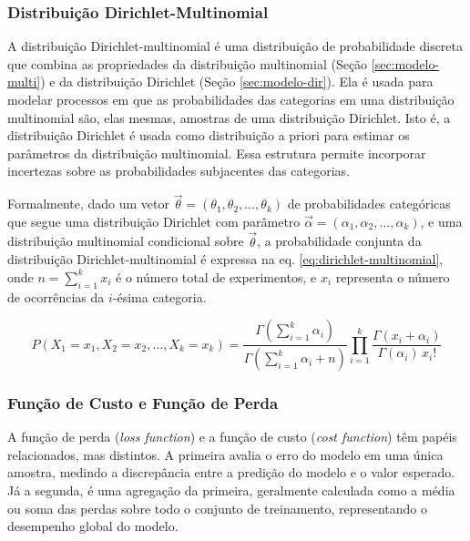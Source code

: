 \subsubsection{Distribuição Dirichlet-Multinomial}
\label{sec:modelo-dir-multi}

A distribuição Dirichlet-multinomial \cite{distbook-dirichlet} é uma distribuição de probabilidade discreta que combina as propriedades da distribuição multinomial (Seção \ref{sec:modelo-multi}) e da distribuição Dirichlet (Seção \ref{sec:modelo-dir}). Ela é usada para modelar processos em que as probabilidades das categorias em uma distribuição multinomial são, elas mesmas, amostras de uma distribuição Dirichlet. Isto é, a distribuição Dirichlet é usada como distribuição a priori para estimar os parâmetros da distribuição multinomial. Essa estrutura permite incorporar incertezas sobre as probabilidades subjacentes das categorias.

Formalmente, dado um vetor \( \vec{\theta} = (\theta_1, \theta_2, \dots, \theta_k) \) de probabilidades categóricas que segue uma distribuição Dirichlet com parâmetro \( \vec{\alpha} = (\alpha_1, \alpha_2, \dots, \alpha_k) \), e uma distribuição multinomial condicional sobre \( \vec{\theta} \), a probabilidade conjunta da distribuição Dirichlet-multinomial é expressa na eq. \eqref{eq:dirichlet-multinomial}, onde \( n = \sum_{i=1}^k x_i \) é o número total de experimentos, e \( x_i \) representa o número de ocorrências da \( i \)-ésima categoria.

\begin{equation}\label{eq:dirichlet-multinomial}
  P(X_1 = x_1, X_2 = x_2, \dots, X_k = x_k) = \frac{\Gamma\left(\sum_{i=1}^k \alpha_i\right)}{\Gamma\left(\sum_{i=1}^k \alpha_i + n\right)} \prod_{i=1}^k \frac{\Gamma(x_i + \alpha_i)}{\Gamma(\alpha_i) \, x_i!}
\end{equation}




\subsubsection{Função de Custo e Função de Perda}
\label{sec:modelo-loss-cost}

A função de perda (\emph{loss function}) e a função de custo (\emph{cost function}) têm papéis relacionados, mas distintos. A primeira avalia o erro do modelo em uma única amostra, medindo a discrepância entre a predição do modelo e o valor esperado. Já a segunda, é uma agregação da primeira, geralmente calculada como a média ou soma das perdas sobre todo o conjunto de treinamento, representando o desempenho global do modelo. %

